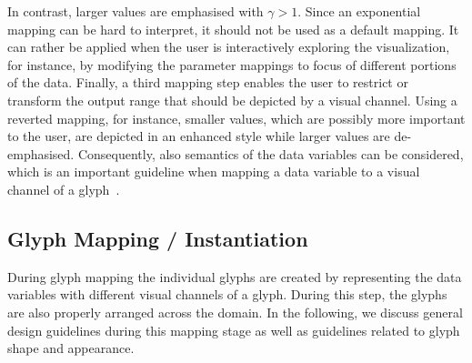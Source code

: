 In contrast, larger values are emphasised with $\gamma > 1$.
Since an exponential mapping can be hard to interpret, it should not be used as a default mapping.
It can rather be applied when the user is interactively exploring the visualization, for instance, by modifying the parameter mappings to focus of different portions of the data.
Finally, a third mapping step enables the user to restrict or transform the output range that should be depicted by a visual channel.
Using a reverted mapping, for instance, smaller values, which are possibly more important to the user, are depicted in an enhanced style while larger values are de-emphasised.
Consequently, also semantics of the data variables can be considered, which is an important guideline when mapping a data variable to a visual channel of a glyph~\cite{ward02glyphPlacement, Ropinski11glyphs}.


\subsection{Glyph Mapping / Instantiation}

During glyph mapping the individual glyphs are created by representing the data variables with different visual channels of a glyph. During this step, the glyphs are also properly arranged across the domain. 
In the following, we discuss general design guidelines during this mapping stage as well as guidelines related to glyph shape and appearance.


